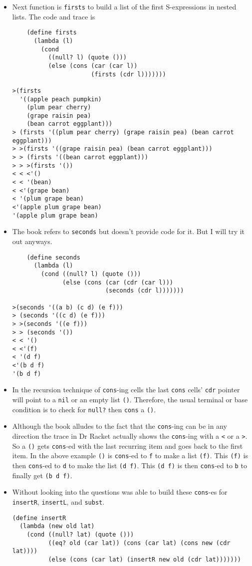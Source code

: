 \documentclass[11pt]{article}
\begin{document}
\begin{itemize}
\begin{verbatim}
\end{verbatim}

\item Next function is \texttt{firsts} to build a list of the first S-expressions in nested lists. The code and trace is
\begin{verbatim}
    (define firsts
      (lambda (l)
        (cond
          ((null? l) (quote ()))
          (else (cons (car (car l))
                      (firsts (cdr l)))))))

>(firsts
  '((apple peach pumpkin)
    (plum pear cherry)
    (grape raisin pea)
    (bean carrot eggplant)))
> (firsts '((plum pear cherry) (grape raisin pea) (bean carrot eggplant)))
> >(firsts '((grape raisin pea) (bean carrot eggplant)))
> > (firsts '((bean carrot eggplant)))
> > >(firsts '())
< < <'()
< < '(bean)
< <'(grape bean)
< '(plum grape bean)
<'(apple plum grape bean)
'(apple plum grape bean)

\end{verbatim}
\item The book refers to \texttt{seconds} but doesn't provide code for it. But I will try it out anyways.
\begin{verbatim}
    (define seconds
      (lambda (l)
        (cond ((null? l) (quote ()))
              (else (cons (car (cdr (car l)))
                          (seconds (cdr l)))))))

>(seconds '((a b) (c d) (e f)))
> (seconds '((c d) (e f)))
> >(seconds '((e f)))
> > (seconds '())
< < '()
< <'(f)
< '(d f)
<'(b d f)
'(b d f)

\end{verbatim}
\item In the recursion technique of \texttt{cons}-ing cells the last \texttt{cons} cells' \texttt{cdr} pointer will point to a \texttt{nil} or an
empty list \texttt{()}. Therefore, the usual terminal or base condition is to check for \texttt{null?} then \texttt{cons} a \texttt{()}.
\item Although the book alludes to the fact that the \texttt{cons}-ing can be in any direction the trace in Dr Racket actually
shows the  \texttt{cons}-ing with a \texttt{<} or a \texttt{>}. So a \texttt{()} gets \texttt{cons}-ed with the last recurring item and goes back to the
first item. In the above example \texttt{()} is \texttt{cons}-ed to \texttt{f} to make a list \texttt{(f)}. This \texttt{(f)} is then \texttt{cons}-ed to \texttt{d}
to make the list \texttt{(d f)}. This \texttt{(d f)} is then \texttt{cons}-ed to \texttt{b} to finally get \texttt{(b d f)}.
\item Without looking into the questions was able to build these \texttt{cons}-es for \texttt{insertR}, \texttt{insertL}, and \texttt{subst}.
\begin{verbatim}
(define insertR
  (lambda (new old lat)
    (cond ((null? lat) (quote ()))
          ((eq? old (car lat)) (cons (car lat) (cons new (cdr lat))))
          (else (cons (car lat) (insertR new old (cdr lat)))))))


\end{verbatim}
\end{itemize}
\end{document}
